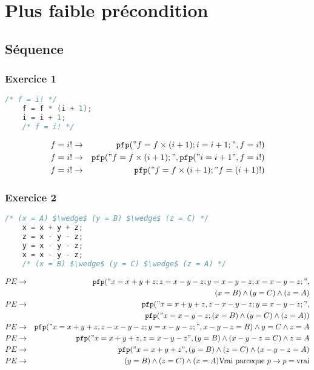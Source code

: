 \section{Plus faible précondition}
\subsection{Séquence}\label{exoPfpSequence}
\subsubsection{Exercice 1}
\begin{lstlisting}[language=C]
	/* f = i! */
	f = f * (i + 1);
	i = i + 1;
	/* f = i! */
\end{lstlisting}
\begin{eqnarray*}
	f = i! &\rightarrow& \texttt{pfp}("f = f\times (i+1); i = i +1;", f= i!)\\
	f=i!&\rightarrow&\texttt{pfp}("f=f\times(i+1);",\texttt{pfp}("i=i+1",f=i!)\\
	f = i! &\rightarrow& \texttt{pfp}("f = f \times (i + 1);" f = (i + 1)!)
\end{eqnarray*}
\newpage
\subsubsection{Exercice 2}
\begin{lstlisting}[language=C]
	/* (x = A) $\wedge$ (y = B) $\wedge$ (z = C) */
	x = x + y + z;
	z = x - y - z;
	y = x - y - z;
	x = x - y - z;
	/* (x = B) $\wedge$ (y = C) $\wedge$ (z = A) */
\end{lstlisting}
\begin{eqnarray*}
	PE &\rightarrow& \texttt{pfp}("x=x+y+z;z=x-y-z;y=x-y-z;x=x-y-z;", \\&&(x=B)\wedge(y=C)\wedge(z=A)\\
	PE &\rightarrow& \texttt{pfp}("x=x+y+z, z-x-y-z;y=x-y-z;", \\&&\texttt{pfp}("x=x-y-z;(x=B)\wedge(y=C)\wedge(z=A))\\
	PE &\rightarrow& \texttt{pfp}("x=x+y+z, z-x-y-z;y=x-y-z;", x-y-z=B)\wedge y=C \wedge z = A\\
	PE &\rightarrow& \texttt{pfp}("x=x+y+z,z=x-y-z", (y=B)\wedge (x-y-z=C)\wedge z = A\\
	PE &\rightarrow& \texttt{pfp}("x=x+y+z", (y=B)\wedge (z=C) \wedge (x-y-z=A)\\
	PE &\rightarrow& (y=B) \wedge (z=C)\wedge(x=A) \textmd{Vrai parceque }p\rightarrow p = \textmd{vrai}
\end{eqnarray*}

